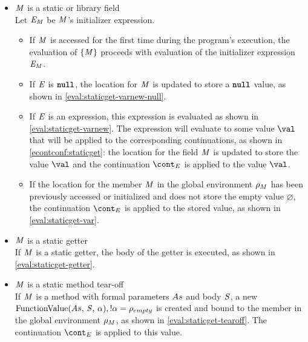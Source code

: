 \documentclass[a4paper,oneside,fleqn]{article}
\renewcommand{\emptyset}{\varnothing}
\newcommand{\synt}[1]{\ensuremath{\text{\textbf{\texttt{#1}}}}}
\DeclareMathOperator{\nnull}{\synt{null}}
\begin{document}
\begin{itemize}
    \item $\mathit{M}$ is a static or library field\\
        Let $\mathit{E}_{\mathit{M}}$ be $\mathit{M}$'s initializer expression.
        \begin{itemize}
            \item If $\mathit{M}$ is accessed for the first time during the program's execution, the evaluation of $\{\mathit{M}\}$ proceeds with evaluation of the initializer expression $\mathit{E}_{\mathit{M}}$.
            \item If $\mathit{E}$ is $\nnull$, the location for $\mathit{M}$ is updated to store a $\nnull$ value, as shown in \eqref{eval:staticget-varnew-null}.
            \item If $\mathit{E}$ is an expression, this expression is evaluated as shown in \eqref{eval:staticget-varnew}.
                The expression will evaluate to some value $\val$ that will be applied to the corresponding continuations, as shown in \eqref{econtconf:staticget}: the location for the field $\mathit{M}$ is updated to store the value $\val$ and the continuation $\econt$ is applied to the value $\val$.
            \item If the location for the member $\mathit{M}$ in the global environment $\rho_{M}$ has been previously accessed or initialized and does not store the empty value $\emptyset$, the continuation $\econt$ is applied to the stored value, as shown in \eqref{eval:staticget-var}.
        \end{itemize}

    \item $\mathit{M}$ is a static getter\\
        If $\mathit{M}$ is a static getter, the body of the getter is executed, as shown in \eqref{eval:staticget-getter}.

    \item $\mathit{M}$ is a static method tear-off\\
        If $\mathit{M}$ is a method with formal parameters $As$ and body $\mathit{S}$, a new $\mathrm{FunctionValue}({As},\,{\mathit{S}},\,{\alpha}), !\alpha = \rho_{empty}$ is created and bound to the member in the global environment $\rho_{M}$, as shown in \eqref{eval:staticget-tearoff}.
        The continuation $\econt$ is applied to this value.

\end{itemize}
\end{document}
